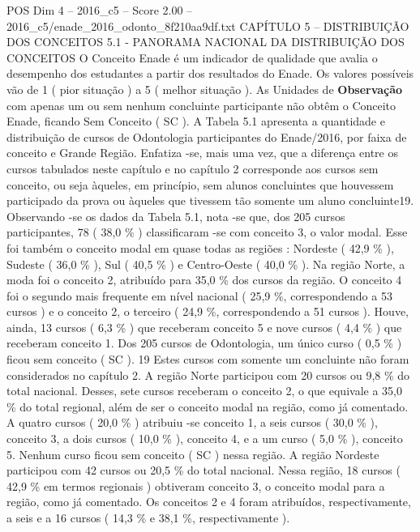 \begin{textsample}{POS Dim 4 – 2016\_c5 – Score 2.00 – 2016\_c5/enade\_2016\_odonto\_8f210aa9df.txt}  \label{ex:f4_pos_106}
CAPÍTULO 5 – DISTRIBUIÇÃO DOS CONCEITOS 5.1 - PANORAMA NACIONAL DA DISTRIBUIÇÃO DOS CONCEITOS O Conceito Enade é um indicador de qualidade que avalia o desempenho dos estudantes a partir dos resultados do Enade.
Os valores possíveis vão de 1 ( pior situação ) a 5 ( melhor situação ).
As Unidades de \textbf{Observação} com apenas um ou sem nenhum concluinte participante não obtêm o Conceito Enade, ficando Sem Conceito ( SC ).
A Tabela 5.1 apresenta a quantidade e distribuição de cursos de Odontologia participantes do Enade/2016, por faixa de conceito e Grande Região.
Enfatiza -se, mais uma vez, que a diferença entre os cursos tabulados neste capítulo e no capítulo 2 corresponde aos cursos sem conceito, ou seja àqueles, em princípio, sem alunos concluintes que houvessem participado da prova ou àqueles que tivessem tão somente um aluno concluinte19.
Observando -se os dados da Tabela 5.1, nota -se que, dos 205 cursos participantes, 78 ( 38,0 \% ) classificaram -se com conceito 3, o valor modal.
Esse foi também o conceito modal em quase todas as regiões : Nordeste ( 42,9 \% ), Sudeste ( 36,0 \% ), Sul ( 40,5 \% ) e Centro-Oeste ( 40,0 \% ).
Na região Norte, a moda foi o conceito 2, atribuído para 35,0 \% dos cursos da região.
O conceito 4 foi o segundo mais frequente em nível nacional ( 25,9 \%, correspondendo a 53 cursos ) e o conceito 2, o terceiro ( 24,9 \%, correspondendo a 51 cursos ).
Houve, ainda, 13 cursos ( 6,3 \% ) que receberam conceito 5 e nove cursos ( 4,4 \% ) que receberam conceito 1.
Dos 205 cursos de Odontologia, um único curso ( 0,5 \% ) ficou sem conceito ( SC ). 19 Estes cursos com somente um concluinte não foram considerados no capítulo 2.
A região Norte participou com 20 cursos ou 9,8 \% do total nacional.
Desses, sete cursos receberam o conceito 2, o que equivale a 35,0 \% do total regional, além de ser o conceito modal na região, como já comentado.
A quatro cursos ( 20,0 \% ) atribuiu -se conceito 1, a seis cursos ( 30,0 \% ), conceito 3, a dois cursos ( 10,0 \% ), conceito 4, e a um curso ( 5,0 \% ), conceito 5.
Nenhum curso ficou sem conceito ( SC ) nessa região.
A região Nordeste participou com 42 cursos ou 20,5 \% do total nacional.
Nessa região, 18 cursos ( 42,9 \% em termos regionais ) obtiveram conceito 3, o conceito modal para a região, como já comentado.
Os conceitos 2 e 4 foram atribuídos, respectivamente, a seis e a 16 cursos ( 14,3 \% e 38,1 \%, respectivamente ).

\end{textsample}
